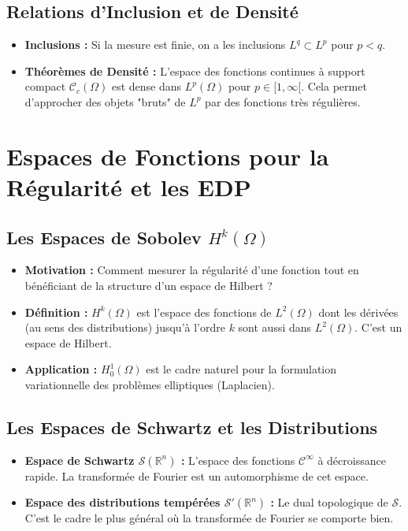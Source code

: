 \documentclass[12pt, a4paper, parskip=full]{report}
\theoremstyle{agregstyle}
\begin{document}
\subsection{Relations d'Inclusion et de Densité}
\begin{itemize}
    \item \textbf{Inclusions :} Si la mesure est finie, on a les inclusions $L^q \subset L^p$ pour $p < q$.
    \item \textbf{Théorèmes de Densité :} L'espace des fonctions continues à support compact $\mathcal{C}_c(\Omega)$ est dense dans $L^p(\Omega)$ pour $p \in [1, \infty[$. Cela permet d'approcher des objets "bruts" de $L^p$ par des fonctions très régulières.
\end{itemize}

\section{Espaces de Fonctions pour la Régularité et les EDP}
\subsection{Les Espaces de Sobolev $H^k(\Omega)$}
\begin{itemize}
    \item \textbf{Motivation :} Comment mesurer la régularité d'une fonction tout en bénéficiant de la structure d'un espace de Hilbert ?
    \item \textbf{Définition :} $H^k(\Omega)$ est l'espace des fonctions de $L^2(\Omega)$ dont les dérivées (au sens des distributions) jusqu'à l'ordre $k$ sont aussi dans $L^2(\Omega)$. C'est un espace de Hilbert.
    \item \textbf{Application :} $H_0^1(\Omega)$ est le cadre naturel pour la formulation variationnelle des problèmes elliptiques (Laplacien).
\end{itemize}
\subsection{Les Espaces de Schwartz et les Distributions}
\begin{itemize}
    \item \textbf{Espace de Schwartz $\mathcal{S}(\mathbb{R}^n)$ :} L'espace des fonctions $\mathcal{C}^\infty$ à décroissance rapide. La transformée de Fourier est un automorphisme de cet espace.
    \item \textbf{Espace des distributions tempérées $\mathcal{S}'(\mathbb{R}^n)$ :} Le dual topologique de $\mathcal{S}$. C'est le cadre le plus général où la transformée de Fourier se comporte bien.
\end{itemize}
\end{document}
